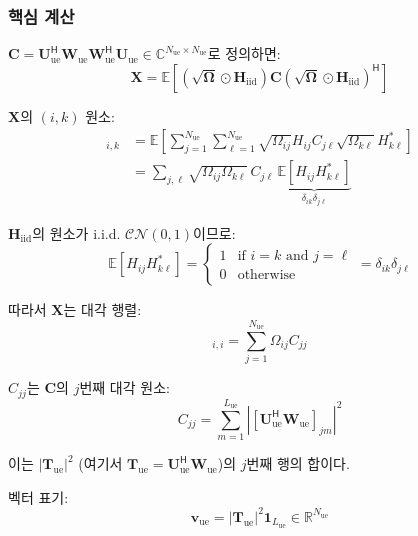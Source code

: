 \documentclass[10pt]{article}
\begin{document}
\subsubsection{핵심 계산}
$\mathbf{C} = \mathbf{U}_{\text{ue}}^{\mathsf{H}} \mathbf{W}_{\text{ue}} \mathbf{W}_{\text{ue}}^{\mathsf{H}} \mathbf{U}_{\text{ue}} \in \mathbb{C}^{N_{\text{ue}} \times N_{\text{ue}}}$로 정의하면:
\begin{equation}
\mathbf{X} = \mathbb{E}\left[ (\sqrt{\boldsymbol{\Omega}} \odot \mathbf{H}_{\text{iid}}) \mathbf{C} (\sqrt{\boldsymbol{\Omega}} \odot \mathbf{H}_{\text{iid}})^{\mathsf{H}} \right]
\end{equation}

$\mathbf{X}$의 $(i,k)$ 원소:
\begin{align}
[\mathbf{X}]_{i,k} &= \mathbb{E}\left[ \sum_{j=1}^{N_{\text{ue}}} \sum_{\ell=1}^{N_{\text{ue}}} \sqrt{\Omega_{ij}} H_{ij} C_{j\ell} \sqrt{\Omega_{k\ell}} H_{k\ell}^* \right] \\
&= \sum_{j,\ell} \sqrt{\Omega_{ij} \Omega_{k\ell}} \, C_{j\ell} \, \underbrace{\mathbb{E}[H_{ij} H_{k\ell}^*]}_{\delta_{ik}\delta_{j\ell}}
\end{align}

$\mathbf{H}_{\text{iid}}$의 원소가 i.i.d. $\mathcal{CN}(0,1)$이므로:
\begin{equation}
\mathbb{E}[H_{ij} H_{k\ell}^*] = \begin{cases} 1 & \text{if } i=k \text{ and } j=\ell \\ 0 & \text{otherwise} \end{cases} = \delta_{ik}\delta_{j\ell}
\end{equation}

따라서 $\mathbf{X}$는 대각 행렬:
\begin{equation}
[\mathbf{X}]_{i,i} = \sum_{j=1}^{N_{\text{ue}}} \Omega_{ij} C_{jj}
\end{equation}

$C_{jj}$는 $\mathbf{C}$의 $j$번째 대각 원소:
\begin{equation}
C_{jj} = \sum_{m=1}^{L_{\text{ue}}} |[\mathbf{U}_{\text{ue}}^{\mathsf{H}} \mathbf{W}_{\text{ue}}]_{jm}|^2
\end{equation}

이는 $|\mathbf{T}_{\text{ue}}|^2$ (여기서 $\mathbf{T}_{\text{ue}} = \mathbf{U}_{\text{ue}}^{\mathsf{H}} \mathbf{W}_{\text{ue}}$)의 $j$번째 행의 합이다.

벡터 표기:
\begin{equation}
\mathbf{v}_{\text{ue}} = |\mathbf{T}_{\text{ue}}|^2 \mathbf{1}_{L_{\text{ue}}} \in \mathbb{R}^{N_{\text{ue}}}
\end{equation}
\end{document}
